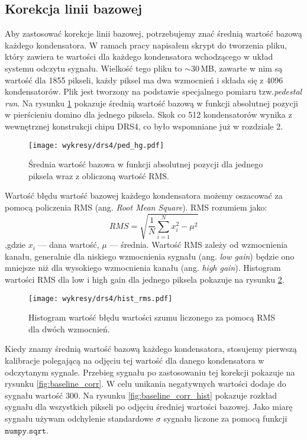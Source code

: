 \documentclass[a4paper,11pt,twoside]{article}
\begin{document}
\subsection{Korekcja linii bazowej}
Aby zastosować korekcje linii bazowej, potrzebujemy znać średnią wartość bazową każdego kondensatora. W ramach pracy napisałem skrypt do tworzenia pliku, który zawiera te wartości dla każdego kondensatora wchodzącego w układ systemu odczytu sygnału. Wielkość tego pliku to $\sim 30$\,MB, zawarte w nim są wartość dla 1855 pikseli, każdy piksel ma dwa wzmocnień i składa się z 4096 kondensatorów. Plik jest tworzony na podstawie specjalnego pomiaru tzw.\textsl{pedestal run}. Na rysunku \ref{fig:ped_4096} pokazuje średnią wartość bazową w funkcji absolutnej pozycji w pierścieniu domino dla jednego piksela. Skok co 512 kondensatorów wynika z wewnętrznej konstrukcji chipu DRS4, co było wspomniane już w rozdziale 2.
\begin{figure}[H] 
\centering
\texttt{[image: wykresy/drs4/ped\_hg.pdf]}
\caption{Średnia wartość bazowa w funkcji absolutnej pozycji dla jednego piksela wraz z obliczoną wartość RMS.}
\label{fig:ped_4096}
\end{figure}
Wartość błędu wartość bazowej każdego kondensatora możemy oszacować za pomocą policzenia RMS (ang. \textsl{Root Mean Square}). RMS rozumiem jako:
\begin{equation}
RMS = \sqrt{ \frac{1}{N} \sum_{i=1}^{N} x_{i}^2 - \mu^2}
\end{equation}
,gdzie $x_{i}$ --- dana wartość, $\mu$ --- średnia.
Wartość RMS zależy od wzmocnienia kanału, generalnie dla niskiego wzmocnienia sygnału (ang. \textsl{low gain}) będzie ono mniejsze niż dla wysokiego wzmocnienia kanału (ang. \textsl{high gain}). Histogram wartości RMS dla low i high gain dla jednego piksela pokazuje na rysunku \ref{fig:hist_rms}.
\begin{figure}[H] 
\centering
\texttt{[image: wykresy/drs4/hist\_rms.pdf]}
\caption{Histogram wartość błędu wartości szumu liczonego za pomocą RMS dla dwóch wzmocnień.}
\label{fig:hist_rms}
\end{figure}
\newpage
Kiedy znamy średnią wartość bazową każdego kondensatora, stosujemy pierwszą kalibracje polegającą na odjęciu tej wartość dla danego kondensatora w odczytanym sygnale. Przebieg sygnału po zastosowaniu tej korekcji pokazuje na rysunku \ref{fig:baseline_corr}. W celu unikania negatywnych wartości dodaje do sygnału wartość 300. Na rysunku \ref{fig:baseline_corr_hist} pokazuje rozkład sygnału dla wszystkich pikseli po odjęciu średniej wartości bazowej. Jako miarę sygnału używam odchylenie standardowe $\sigma$ sygnału liczone za pomocą funkcji $\mathtt{numpy.sqrt}$.
\end{document}
